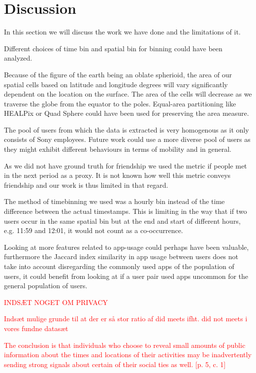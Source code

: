 \chapter{Discussion}
\label{chap:discussion}
In this section we will discuss the work we have done and the limitations of it.

Different choices of time bin and spatial bin for binning could have been analyzed.

Because of the figure of the earth being an oblate spherioid, the area of our spatial cells based on latitude and longitude degrees will vary significantly dependent on the location on the surface. The area of the cells will decrease as we traverse the globe from the equator to the poles. Equal-area partitioning like HEALPix or Quad Sphere could have been used for preserving the area measure.

The pool of users from which the data is extracted is very homogenous as it only consists of Sony employees. Future work could use a more diverse pool of users as they might exhibit different behaviours in terms of mobility and in general.

As we did not have ground truth for friendship we used the metric if people met in the next period as a proxy. It is not known how well this metric conveys friendship and our work is thus limited in that regard.

The method of timebinning we used was a hourly bin instead of the time difference between the actual timestamps. This is limiting in the way that if two users occur in the same spatial bin but at the end and start of different hours, e.g. 11:59 and 12:01, it would not count as a co-occurrence.

Looking at more features related to app-usage could perhaps have been valuable, furthermore the Jaccard index similarity in app usage between users does not take into account disregarding the commonly used apps of the population of users, it could benefit from looking at if a user pair used apps uncommon for the general population of users.

\textcolor{red}{INDSÆT NOGET OM PRIVACY}

\textcolor{red}{Indsæt mulige grunde til at der er så stor ratio af did meets ifht. did not meets i vores fundne datasæt}

\textcolor{red}{The conclusion is that individuals who choose to reveal small amounts of public information about the times and locations of their activities may be inadvertently sending strong signals about certain of their social ties as well. [p. 5, c. 1]}


